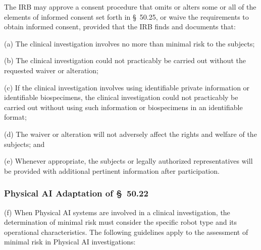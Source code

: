 \documentclass[11pt]{article}
\begin{document}
The IRB may approve a consent procedure that omits or alters some or all of the elements of informed consent set forth in \S~50.25, or waive the requirements to obtain informed consent, provided that the IRB finds and documents that:

(a) The clinical investigation involves no more than minimal risk to the subjects;

(b) The clinical investigation could not practicably be carried out without the requested waiver or alteration;

(c) If the clinical investigation involves using identifiable private information or identifiable biospecimens, the clinical investigation could not practicably be carried out without using such information or biospecimens in an identifiable format;

(d) The waiver or alteration will not adversely affect the rights and welfare of the subjects; and

(e) Whenever appropriate, the subjects or legally authorized representatives will be provided with additional pertinent information after participation.

\subsubsection{Physical AI Adaptation of \S~50.22}

(f) When Physical AI systems are involved in a clinical investigation, the determination of minimal risk must consider the specific robot type and its operational characteristics. The following guidelines apply to the assessment of minimal risk in Physical AI investigations:
\end{document}
